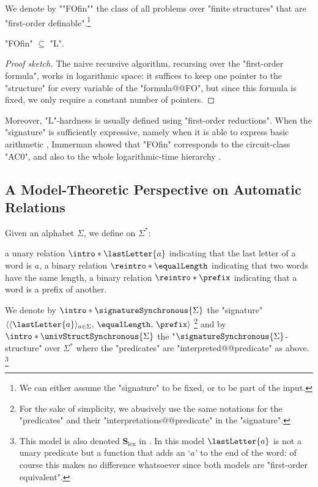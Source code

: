 We denote by \AP""FOfin"" the class of all problems over "finite structures" that are "first-order definable".\footnote{We can either assume the "signature" to be fixed, or to be part of the input.}

\begin{proposition}[Folklore]
	\label{prop:FO-in-L}
	"FOfin" $\subseteq$ "L".
\end{proposition}

\begin{proof}[Proof sketch]
	The naive recursive algorithm, recursing over the "first-order formula",
	works in logarithmic space: it suffices to keep one pointer to the "structure"
	for every variable of the "formula@@FO", but since this formula is fixed, we only
	require a constant number of pointers.
\end{proof}

Moreover, "L"-hardness is usually defined using "first-order reductions".
When the "signature" is sufficiently expressive, namely when it is able to
express basic arithmetic \cite[Proviso~1.14]{Immerman1998DescriptiveComplexity},
Immerman showed that "FOfin" corresponds to the circuit-class "AC0",
and also to the whole logarithmic-time hierarchy
\cite[Corollary~5.32]{Immerman1998DescriptiveComplexity}.


\subsection{A Model-Theoretic Perspective on Automatic Relations}

Given an alphabet $\Sigma$, we define on $\Sigma^*$:
\begin{itemize}
	\itemAP a unary relation $\intro*\lastLetter{a}$ indicating that the last letter of a word is $a$,
	\itemAP a binary relation $\reintro*\equalLength$ indicating that two words have the same length,
	\itemAP a binary relation $\reintro*\prefix$ indicating that a word is a prefix of another.
\end{itemize} 
We denote by $\intro*\signatureSynchronous{\Sigma}$ the "signature" $\langle \langle\lastLetter{a}\rangle_{a \in \Sigma},\, \equalLength,\, \prefix \rangle$%
\footnote{For the sake of simplicity, we abusively use the same notations for
the "predicates" and their "interpretations@@predicate" in the "signature".} and
by \AP$\intro*\univStructSynchronous{\Sigma}$ the "$\signatureSynchronous{\Sigma}$-structure"
over $\Sigma^*$ where the "predicates" are "interpreted@@predicate" as above.%
\footnote{This model is also denoted $\symbf{S}_{\mathrm{len}}$ in \cite{BenediktLibkinSchwentickSegoufin2003DefinableRelations}. In this model $\lastLetter{a}$ is
not a unary predicate but a function that adds an `$a$' to the end of the word: of course this
makes no difference whatsoever since both models are "first-order equivalent".}

